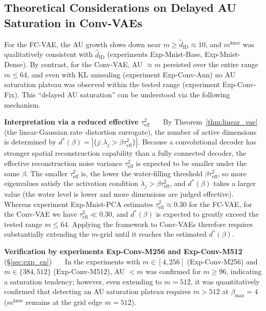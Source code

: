 \documentclass[make,article,submit,pdftex,moreauthors]{Definitions/mdpi}
\newcommand{\mknee}{m^{\mathrm{knee}}}
\begin{document}
\subsection{Theoretical Considerations on Delayed AU Saturation in Conv-VAEs}\label{sec:disc_convvae}

For the FC-VAE, the AU growth slows down near $m \geq \hat{d}_\mathrm{ID} \approx 10$,
and $\mknee$ was qualitatively consistent with $\hat{d}_\mathrm{ID}$ (experiments
Exp-Mnist-Base, Exp-Mnist-Dense).
By contrast, for the Conv-VAE, AU $\approx m$ persisted over the entire range
$m \leq 64$, and even with KL annealing (experiment Exp-Conv-Ann) no AU saturation
plateau was observed within the tested range (experiment Exp-Conv-Fix).
This ``delayed AU saturation'' can be understood via the following mechanism.

\textbf{Interpretation via a reduced effective $\tau^2_\mathrm{eff}$}~~~
By Theorem~\ref{thm:linear_vae} (the linear-Gaussian rate--distortion surrogate),
the number of active dimensions is determined by
$d^*(\beta) = |\{j : \lambda_j > \beta\tau^2_\mathrm{eff}\}|$.
Because a convolutional decoder has stronger spatial reconstruction capability than a
fully connected decoder, the effective reconstruction noise variance
$\tau^2_\mathrm{eff}$ is expected to be smaller under the same $\beta$.
The smaller $\tau^2_\mathrm{eff}$ is, the lower the water-filling threshold
$\beta\tau^2_\mathrm{eff}$, so more eigenvalues satisfy the activation condition
$\lambda_j > \beta\tau^2_\mathrm{eff}$, and $d^*(\beta)$ takes a larger value
(the water level is lower and more dimensions are judged effective).
Whereas experiment Exp-Mnist-PCA estimates $\tau^2_\mathrm{eff} \approx 0.30$ for the
FC-VAE, for the Conv-VAE we have $\tau^2_\mathrm{eff} \ll 0.30$, and $d^*(\beta)$ is
expected to greatly exceed the tested range $m \leq 64$.
Applying the framework to Conv-VAEs therefore requires substantially extending the
$m$-grid until it reaches the estimated $d^*(\beta)$.

\textbf{Verification by experiments Exp-Conv-M256 and Exp-Conv-M512} (\S\ref{sec:exp_en})~~~
In the experiments with $m \in [4,256]$ (Exp-Conv-M256) and $m \in \{384,512\}$
(Exp-Conv-M512), AU $< m$ was confirmed for $m \geq 96$, indicating a saturation
tendency; however, even extending to $m=512$, it was quantitatively confirmed that
detecting an AU saturation plateau requires $m>512$ at $\beta_{\max}=4$
($\mknee$ remains at the grid edge $m=512$).
\end{document}
